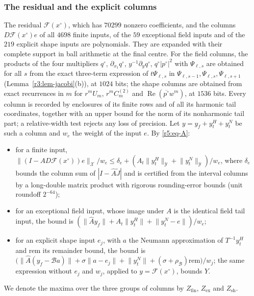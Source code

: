 \documentclass[11pt]{amsart}
\theoremstyle{definition}
\theoremstyle{remark}
\numberwithin{equation}{section}
\newcommand{\Fc}{\mathcal{F}}
\DeclareMathOperator{\re}{Re}
\newcommand{\nrm}[1]{\lVert #1\rVert}
\begin{document}
\subsubsection*{The residual and the explicit columns}
The residual $\Fc(x^\circ)$, which has $70299$ nonzero coefficients, and the columns $D\Fc(x^\circ)e$ of all $4698$ finite inputs, of the $59$ exceptional field inputs and of the $219$ explicit shape inputs are polynomials. They are expanded with their complete support in ball arithmetic at the final centre. For the field columns, the products of the four multipliers $q^\circ$, $\partial_{x_1}q^\circ$, $y^{-1}\partial_yq^\circ$, $q^\circ|p^\circ|^2$ with $\Psi_{\ell,s}$ are obtained for all $s$ from the exact three-term expression of $t\Psi_{\ell,s}$ in $\Psi_{\ell,s-1},\Psi_{\ell,s},\Psi_{\ell,s+1}$ (Lemma~\ref{r3:lem-jacobi}(b)), at $1024$ bits; the shape columns are obtained from exact recurrences in $m$ for $r^mU_m$, $r^mC^{(2)}_m$ and $\re(\overline{p^\circ}w^m)$, at $1536$ bits. Every column is recorded by enclosures of its finite rows and of all its harmonic tail coordinates, together with an upper bound for the norm of its nonharmonic tail part; a relative-width test rejects any loss of precision. Let $y=y_f+y^H_t+y^N_t$ be such a column and $w_e$ the weight of the input $e$. By \eqref{r5:eq-A}:
\begin{itemize}
\item for a finite input, $\nrm{(I-AD\Fc(x^\circ))e}_{\mathcal X}/w_e\leq\delta_e+(A_t\nrm{y^H_t}_{\mathcal Y}+\nrm{y^N_t}_{\mathcal Y})/w_e$, where $\delta_e$ bounds the column sum of $|I-\widehat A\widetilde J|$ and is certified from the interval columns by a long-double matrix product with rigorous rounding-error bounds (unit roundoff $2^{-64}$);
\item for an exceptional field input, whose image under $A$ is the identical field tail input, the bound is $(\nrm{\widehat Ay_f}+A_t\nrm{y^H_t}+\nrm{y^N_t-e})/w_e$;
\item for an explicit shape input $e_j$, with $a$ the Neumann approximation of $T^{-1}y^H_t$ and $\mathrm{rem}$ its remainder bound, the bound is $\big(\nrm{\widehat A(y_f-\mathcal Ba)}+\sigma\nrm{a-e_j}+\nrm{y^N_t}+(\sigma+\rho_{\mathcal B})\mathrm{rem}\big)/w_j$; the same expression without $e_j$ and $w_j$, applied to $y=\Fc(x^\circ)$, bounds $Y$.
\end{itemize}
We denote the maxima over the three groups of columns by $Z_{\mathrm{fin}}$, $Z_{\mathrm{ex}}$ and $Z_{\mathrm{sh}}$.
\end{document}
